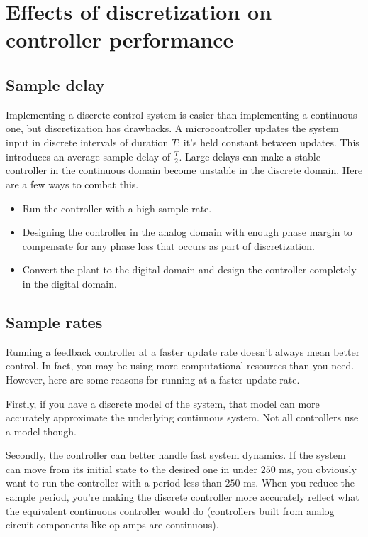 \section{Effects of discretization on controller performance}

\subsection{Sample delay}

Implementing a discrete control system is easier than implementing a continuous
one, but \gls{discretization} has drawbacks. A microcontroller updates the
system input in discrete intervals of duration $T$; it's held constant between
updates. This introduces an average sample delay of $\frac{T}{2}$. Large delays
can make a stable controller in the continuous domain become unstable in the
discrete domain. Here are a few ways to combat this.
\begin{itemize}
  \item Run the controller with a high sample rate.
  \item Designing the controller in the analog domain with enough
    \gls{phase margin} to compensate for any phase loss that occurs as part of
    \gls{discretization}.
  \item Convert the \gls{plant} to the digital domain and design the controller
    completely in the digital domain.
\end{itemize}

\subsection{Sample rates}

Running a feedback controller at a faster update rate doesn't always mean better
control. In fact, you may be using more computational resources than you need.
However, here are some reasons for running at a faster update rate.

Firstly, if you have a discrete \gls{model} of the \gls{system}, that
\gls{model} can more accurately approximate the underlying continuous
\gls{system}. Not all controllers use a \gls{model} though.

Secondly, the controller can better handle fast \gls{system} dynamics. If the
\gls{system} can move from its initial state to the desired one in under $250$
ms, you obviously want to run the controller with a period less than $250$ ms.
When you reduce the sample period, you're making the discrete controller more
accurately reflect what the equivalent continuous controller would do
(controllers built from analog circuit components like op-amps are continuous).

